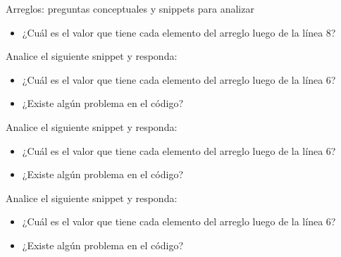 \documentclass[xcolor=pdftex,table,11pt]{beamer}
\begin{document}
\begin{frame}[allowframebreaks]{Arreglos: preguntas conceptuales y snippets para analizar}
\codesetstylefrombeamer
{}


\begin{itemize}

\item ¿Cuál es el valor que tiene cada elemento del arreglo luego de la línea 8?

\end{itemize}




\newpage

Analice el siguiente snippet y responda:

\codesetstylefrombeamer
{}


\begin{itemize}

\item ¿Cuál es el valor que tiene cada elemento del arreglo luego de la línea 6?


\item ¿Existe algún problema en el código?
\end{itemize}

\newpage

Analice el siguiente snippet y responda:

\codesetstylefrombeamer
{}


\begin{itemize}

\item ¿Cuál es el valor que tiene cada elemento del arreglo luego de la línea 6?


\item ¿Existe algún problema en el código?

\end{itemize}

\newpage

Analice el siguiente snippet y responda:

\codesetstylefrombeamer
{}


\begin{itemize}

\item ¿Cuál es el valor que tiene cada elemento del arreglo luego de la línea 6?


\item ¿Existe algún problema en el código?

\end{itemize}


\end{frame}
\end{document}
